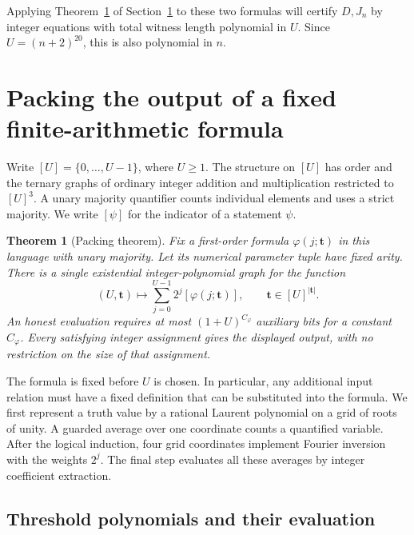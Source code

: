 \documentclass[11pt,letterpaper]{article}
\newtheorem{theorem}{Theorem}[section]
\numberwithin{equation}{section}
\begin{document}
Applying Theorem~\ref{thm:unarycompiler} of
Section~\ref{sec:unarycompiler} to these two formulas will certify
\(D,J_n\) by integer equations with total witness length polynomial in
\(U\). Since \(U=(n+2)^{20}\), this is also polynomial in \(n\).

\section{Packing the output of a fixed finite-arithmetic formula}
\label{sec:unarycompiler}

Write $[U]=\{0,\ldots,U-1\}$, where $U\ge1$. The structure on $[U]$
has order and the ternary graphs of ordinary integer addition and
multiplication restricted to $[U]^3$. A unary majority quantifier counts
individual elements and uses a strict majority. We write $[\psi]$ for
the indicator of a statement $\psi$.

\begin{theorem}[Packing theorem]\label{thm:unarycompiler}
Fix a first-order formula $\varphi(j;\mathbf t)$ in this language with
unary majority. Let its numerical parameter tuple have fixed arity. There is a
single existential integer-polynomial graph for the function
\[
 (U,\mathbf t)\longmapsto \sum_{j=0}^{U-1}2^j[\varphi(j;\mathbf t)],
 \qquad \mathbf t\in[U]^{|\mathbf t|}.
\]
An honest evaluation requires at most $(1+U)^{C_\varphi}$ auxiliary
bits for a constant $C_\varphi$. Every satisfying integer assignment
gives the displayed output, with no restriction on the size of that
assignment.
\end{theorem}

The formula is fixed before $U$ is chosen. In particular, any additional
input relation must have a fixed definition that can be substituted into
the formula. We first represent a truth value by a rational Laurent
polynomial on a grid of roots of unity. A guarded average over one
coordinate counts a quantified variable. After the logical induction,
four grid coordinates implement Fourier inversion with the weights $2^j$. The final step
evaluates all these averages by integer coefficient extraction.

\subsection{Threshold polynomials and their evaluation}
\end{document}
